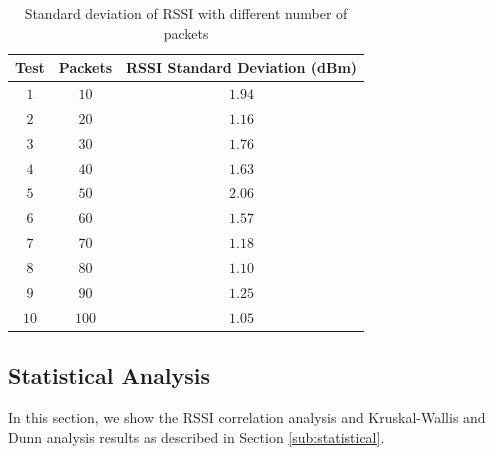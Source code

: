 \begin{table}[!htb]
\centering
\caption{Standard deviation of RSSI with different number of packets}
\label{tab:stdmessages}
\begin{tabular}{@{}ccc@{}}
\toprule
\textbf{Test} & \textbf{Packets} & \textbf{RSSI Standard Deviation (dBm)} \\ \midrule
$1$                    & $10$                     & $1.94$                                \\
$2$                    & $20$                     & $1.16$                                \\
$3$                    & $30$                     & $1.76$                                \\
$4$                    & $40$                     & $1.63$                                \\
$5$                    & $50$                     & $2.06$                                \\
$6$                    & $60$                     & $1.57$                                \\
$7$                    & $70$                     & $1.18$                                \\
$8$                    & $80$                     & $1.10$                                \\
$9$                    & $90$                     & $1.25$                                \\
$10$                   & $100$                    & $1.05$                                \\ \bottomrule
\end{tabular}
\end{table}

\subsection{Statistical Analysis}
In this section, we show the RSSI correlation analysis and Kruskal-Wallis and Dunn analysis results as described in Section \ref{sub:statistical}.

